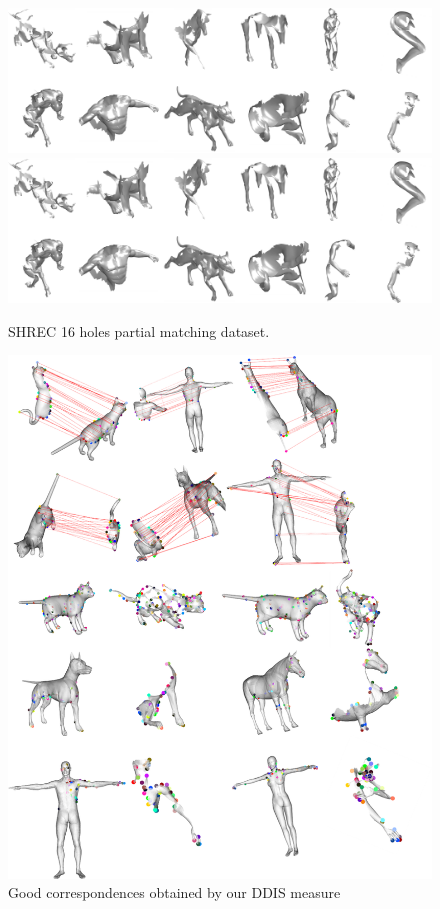 \documentclass[10pt,twocolumn,letterpaper]{article}
\begin{document}
\begin{figure}[htb]
	\centering
	\ifpdf
	\includegraphics[width=1\textwidth]{figures/Holes.png}
	\else
	\includegraphics[width=1\textwidth]{figures/Holes.png}
	\fi
	\caption{SHREC 16 holes partial matching dataset.}
\end{figure}

\begin{figure}[htb]
	\centering

	\includegraphics[width=1\textwidth]{figures/success_1}
	\caption{Good correspondences obtained by our DDIS measure}
\end{figure}
\end{document}

